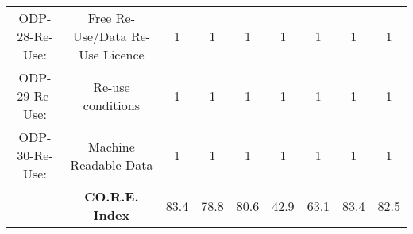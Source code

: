 \documentclass[a4paper, twoside]{report}
\begin{document}
\begin{table}[htbp]
\begin{adjustbox}{max width=\linewidth}
\begin{tabular}{rcccccccc}
    \multicolumn{1}{c}{ODP-28-Re-Use:} & \multicolumn{1}{p{19em}}{\cellcolor[rgb]{ .749,  .749,  .749}Free Re-Use/Data Re-Use Licence} & \cellcolor[rgb]{ .749,  .749,  .749}1 & \cellcolor[rgb]{ .749,  .749,  .749}1 & \cellcolor[rgb]{ .749,  .749,  .749}1 & \cellcolor[rgb]{ .749,  .749,  .749}1 & \cellcolor[rgb]{ .749,  .749,  .749}1 & \cellcolor[rgb]{ .749,  .749,  .749}1 & \cellcolor[rgb]{ .749,  .749,  .749}1 \\
    \multicolumn{1}{c}{ODP-29-Re-Use:} & \multicolumn{1}{p{19em}}{\cellcolor[rgb]{ .749,  .749,  .749}Re-use conditions} & \cellcolor[rgb]{ .749,  .749,  .749}1 & \cellcolor[rgb]{ .749,  .749,  .749}1 & \cellcolor[rgb]{ .749,  .749,  .749}1 & \cellcolor[rgb]{ .749,  .749,  .749}1 & \cellcolor[rgb]{ .749,  .749,  .749}1 & \cellcolor[rgb]{ .749,  .749,  .749}1 & \cellcolor[rgb]{ .749,  .749,  .749}1 \\
    \multicolumn{1}{c}{ODP-30-Re-Use:} & \multicolumn{1}{p{19em}}{\cellcolor[rgb]{ .749,  .749,  .749}Machine Readable Data} & \cellcolor[rgb]{ .749,  .749,  .749}1 & \cellcolor[rgb]{ .749,  .749,  .749}1 & \cellcolor[rgb]{ .749,  .749,  .749}1 & \cellcolor[rgb]{ .749,  .749,  .749}1 & \cellcolor[rgb]{ .749,  .749,  .749}1 & \cellcolor[rgb]{ .749,  .749,  .749}1 & \cellcolor[rgb]{ .749,  .749,  .749}1 \\
    \midrule
          & \textbf{CO.R.E. Index} & 83.4  & 78.8  & 80.6  & 42.9  & 63.1  & 83.4  & 82.5 \\
    \end{tabular}%
    \end{adjustbox}
  \label{tab:score_final3}%
\end{table}%
\end{document}
